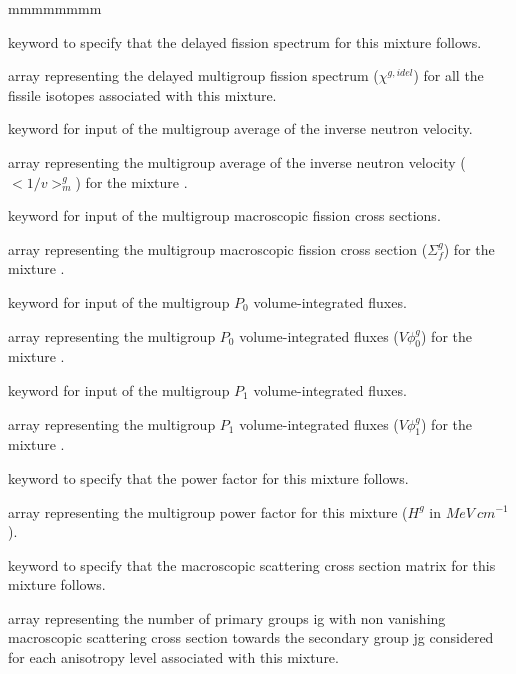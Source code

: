 \begin{ListeDeDescription}{mmmmmmmm}
\item[\moc{CHDL}] keyword to specify that the delayed fission spectrum for this mixture
follows.

\item[\dusa{xschid}] array representing the delayed multigroup fission spectrum
($\chi^{g,idel}$) for all the fissile isotopes associated with this mixture.

\item[\moc{OVERV}] keyword for input of the multigroup average of the inverse neutron velocity.

\item[\dusa{overv}] array representing the multigroup average of the inverse neutron velocity ($<1/v>_{m}^g$) for the mixture 
. 

\item[\moc{NFTOT}] keyword for input of the multigroup macroscopic fission cross sections.

\item[\dusa{nftot}] array representing the multigroup macroscopic fission cross section ($\Sigma_{f}^g$) for the mixture 
. 

\item[\moc{FLUX-INTG}] keyword for input of the multigroup $P_0$ volume-integrated fluxes.

\item[\dusa{xsint0}] array representing the multigroup $P_0$ volume-integrated fluxes ($V\phi_0^g$) for the mixture 
. 

\item[\moc{FLUX-INTG-P1}] keyword for input of the multigroup $P_1$ volume-integrated fluxes.

\item[\dusa{xsint1}] array representing the multigroup $P_1$ volume-integrated fluxes ($V\phi_1^g$) for the mixture 
. 

\item[\moc{H-FACTOR}] keyword to specify that the power factor for
this mixture follows.

\item[\dusa{hfact}] array representing the multigroup power factor for this
mixture ($H^{g}$ in $MeV~cm^{-1}$). 

\item[\moc{SCAT}] keyword to specify that the macroscopic scattering cross
section matrix for this mixture follows.

\item[\dusa{nbscat}] array representing the number of primary groups ig with
non vanishing macroscopic scattering cross section towards the secondary group jg
considered for each anisotropy level associated with this mixture.


\end{ListeDeDescription}
